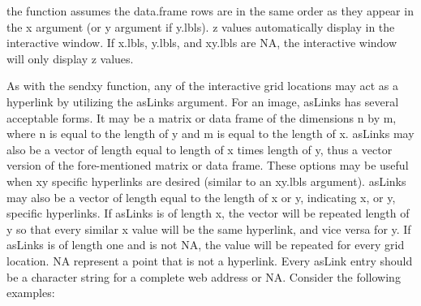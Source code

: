 \documentclass[]{article}
\begin{document}
 the function assumes the data.frame rows are in the same order as they appear in the x argument (or y argument if y.lbls).  \newline
{} z values automatically display in the interactive window. If x.lbls, y.lbls, and xy.lbls are NA, the interactive window will only display z values. \newline


\indent As with the sendxy function, any of the interactive grid locations may act as a hyperlink by utilizing the asLinks argument. For an image, asLinks has several acceptable forms. It may be a matrix or data frame of the dimensions n by m, where n is equal to the length of y and m is equal to the length of x. asLinks may also be a vector of length equal to length of x times length of y, thus a vector version of the fore-mentioned matrix or data frame. These options may be useful when xy specific hyperlinks are desired (similar to an xy.lbls argument). asLinks may also be a vector of length equal to the length of x or y, indicating x, or y, specific hyperlinks. If asLinks is of length x, the vector will be repeated length of y so that every similar x value will be the same hyperlink, and vice versa for y. If asLinks is of length one and is not NA, the value will be repeated for every grid location. NA represent a point that is not a hyperlink.  Every asLink entry should be a character string for a complete web address or NA. Consider the following examples:
\end{document}
